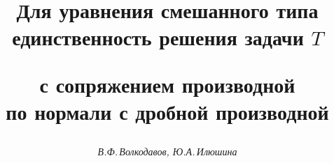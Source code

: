 

 




 


\newcommand{\sgn}{\operatorname{sgn}} 


\newcommand{\const}{\operatorname{const}} 


\newcommand{\tts}[1]{} 


 




 


\setcounter{page}{6} 












 


\author{\it В.Ф.\,Волкодавов, Ю.А.\,Илюшина} 




\title{Для уравнения смешанного типа единственность решения задачи $T$ 


с сопряжением производной\\ по нормали с дробной производной} 


 


\date{} 




\pagestyle{plain} %


 




